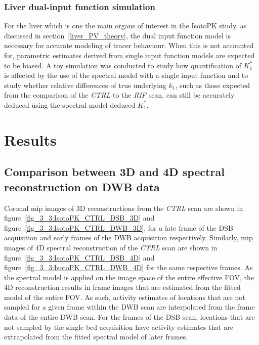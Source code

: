 \subsubsection{Liver dual-input function simulation}
For the liver which is one the main organs of interest in the IsotoPK study, as discussed in section~\ref{liver_PV_theory}, the dual input function model is necessary for accurate modeling of tracer behaviour. 
When this is not accounted for, parametric estimates derived from single input function models are expected to be biased.  
A toy simulation was conducted to study how quantification of $K_1^{*}$ is affected by the use of the spectral model with a single input function and to study whether relative differences of true underlying $k_1$, such as those expected from the comparison of the \textit{CTRL} to the \textit{RIF} scan, can still be accurately deduced using the spectral model deduced $K_1^{*}$.

\section{Results}
\subsection{Comparison between 3D and 4D spectral reconstruction on DWB data}
Coronal \gls{mip} images of 3D reconstructions from the \textit{CTRL} scan are shown in figure~\ref{fig_3_3:IsotoPK_CTRL_DSB_3D} and figure~\ref{fig_3_3:IsotoPK_CTRL_DWB_3D}, for a late frame of the DSB acquisition and early frames of the DWB acquisition respectively. 
Similarly, \gls{mip} images of 4D spectral reconstruction of the \textit{CTRL} scan are shown in figure~\ref{fig_3_3:IsotoPK_CTRL_DSB_4D} and figure~\ref{fig_3_3:IsotoPK_CTRL_DWB_4D} for the same respective frames. 
As the spectral model is applied on the image space of the entire effective FOV, the 4D reconstruction results in frame images that are estimated from the fitted model of the entire FOV. As such, activity estimates of locations that are not sampled for a given frame within the DWB scan are interpolated from the frame data of the entire DWB scan. For the frames of the DSB scan, locations that are not sampled by the single bed acquisition have activity estimates that are extrapolated from the fitted spectral model of later frames.

